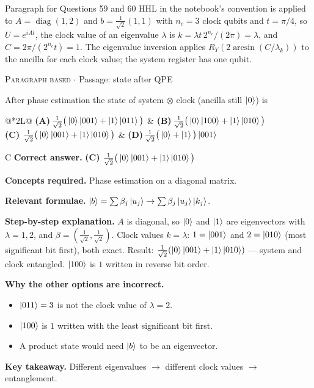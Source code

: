 \documentclass[11pt,a4paper]{article}
\newcommand{\optlabel}[1]{\textbf{(#1)}}
\newcommand{\correctlabel}[1]{\textcolor{okgreen}{\textbf{(#1)}\,\ding{51}}}
\newenvironment{qitem}[1]{\begin{list}{}{\setlength{\leftmargin}{3.3em}\setlength{\labelwidth}{3.1em}%
  \setlength{\labelsep}{0.2em}\setlength{\topsep}{3pt}\setlength{\parsep}{3pt}}\item[\textbf{Q.#1}\hfill]}{\end{list}}
\newcommand{\qsep}{\par\vspace{2pt}{\color{black!15}\hrule}\vspace{4pt}}
\newcommand{\qmeta}[2]{{\footnotesize\color{black!60}\textsc{#1} \;$\cdot$\; #2}\par}
\begin{document}
\begin{passagebox}{Paragraph for Questions 59 and 60}
HHL in the notebook's convention is applied to $A = \operatorname{diag}(1, 2)$ and $b = \tfrac{1}{\sqrt2}(1, 1)$ with $n_c = 3$ clock qubits and $t = \pi/4$, so
$U = e^{iAt}$, the clock value of an eigenvalue $\lambda$ is $k = \lambda t\,2^{n_c}/(2\pi) = \lambda$, and $C = 2\pi/(2^{n_c}t) = 1$. The eigenvalue inversion applies
$R_Y(2\arcsin(C/\lambda_k))$ to the ancilla for each clock value; the system register has one qubit.
\end{passagebox}
\begin{qitem}{59}
\qmeta{Paragraph based}{Passage: state after QPE}
After phase estimation the state of system $\otimes$ clock (ancilla still $\ket0$) is
\par\smallskip\noindent\begin{tabularx}{\linewidth}{@{}*{2}{L}@{}}
\optlabel{A}\,$\tfrac{1}{\sqrt2}\big(\ket0\ket{001} + \ket1\ket{011}\big)$ & \optlabel{B}\,$\tfrac{1}{\sqrt2}\big(\ket0\ket{100} + \ket1\ket{010}\big)$ \\[3pt]
\correctlabel{C}\,$\tfrac{1}{\sqrt2}\big(\ket0\ket{001} + \ket1\ket{010}\big)$ & \optlabel{D}\,$\tfrac{1}{\sqrt2}\big(\ket0 + \ket1\big)\ket{001}$
\end{tabularx}
\end{qitem}
\begin{solbox}{C}
\textbf{\color{brand}Correct answer.} \textcolor{okgreen}{\textbf{(C)}} $\tfrac{1}{\sqrt2}\big(\ket0\ket{001} + \ket1\ket{010}\big)$

\textbf{\color{brand}Concepts required.} Phase estimation on a diagonal matrix.

\textbf{\color{brand}Relevant formulae.} $\ket b = \sum\beta_j\ket{u_j} \to \sum\beta_j\ket{u_j}\ket{k_j}$.

\textbf{\color{brand}Step-by-step explanation.} $A$ is diagonal, so $\ket0$ and $\ket1$ are eigenvectors with $\lambda = 1, 2$, and $\beta = (\tfrac{1}{\sqrt2}, \tfrac{1}{\sqrt2})$. Clock values $k = \lambda$: $1 = \ket{001}$ and $2 = \ket{010}$ (most significant
bit first), both exact. Result: $\tfrac{1}{\sqrt2}(\ket0\ket{001} + \ket1\ket{010})$ --- system and clock entangled. $\ket{100}$ is $1$ written in reverse bit order.

\textbf{\color{brand}Why the other options are incorrect.}
\begin{itemize}[leftmargin=2.4em, itemsep=1pt, topsep=2pt]
\item[\textbf{(A)}] $\ket{011} = 3$ is not the clock value of $\lambda = 2$.
\item[\textbf{(B)}] $\ket{100}$ is $1$ written with the least significant bit first.
\item[\textbf{(D)}] A product state would need $\ket b$ to be an eigenvector.
\end{itemize}
\textbf{\color{brand}Key takeaway.} Different eigenvalues $\to$ different clock values $\to$ entanglement.
\end{solbox}
\qsep
\end{document}
